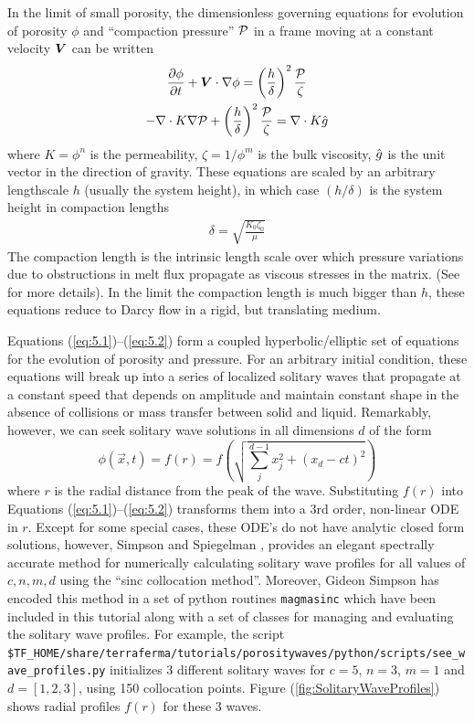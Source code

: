 In the limit of small porosity, the dimensionless governing equations for evolution
of porosity $\phi$ and ``compaction pressure'' $\mathcal{P}$ in a frame
moving at a constant velocity ${\mbox{\boldmath$V$}}$ can be written
\begin{gather}
  \frac{\partial\phi}{\partial t} + {\mbox{\boldmath$V$}}\cdot\nabla\phi = 
  \left(
    \frac{h}{\delta}
  \right)^{2}\frac{\mathcal{P}}{\zeta}  \label{eq:5.1}\\
-\nabla\cdot K \nabla\mathcal{P} + \left(
    \frac{h}{\delta}
  \right)^{2}\frac{\mathcal{P}}{\zeta} = \nabla\cdot K \hat{g}    \label{eq:5.2}
\end{gather}
where $K=\phi^{n}$ is the permeability, $\zeta = 1/\phi^{m}$ is the
bulk viscosity, $\hat{g}$ is the unit vector in the direction of
gravity.  These equations are scaled by an arbitrary lengthscale $h$
(usually the system height), in which case  $(h/\delta)$ is  the
system height  in compaction lengths
\begin{gather}
  \delta = \sqrt{\frac{K_{0}\zeta_0}{\mu}}
\end{gather}
The compaction length is the intrinsic length scale over which
pressure variations due to obstructions in melt flux propagate as
viscous stresses in the matrix. (See
\cite{spiegelman_flow_1993,spiegelman_flow_1993-1} for more
details). In the limit the compaction length is much bigger than $h$,
these equations reduce to Darcy flow in a rigid, but translating medium.

Equations (\ref{eq:5.1})--(\ref{eq:5.2}) form a coupled
hyperbolic/elliptic set of equations for the evolution of porosity and
pressure.  For an arbitrary initial condition, these equations will
break up into a series of localized solitary waves that propagate at a
constant speed that depends on amplitude and maintain constant shape
in the absence of collisions or mass transfer between solid and
liquid.  Remarkably, however, we can seek solitary wave solutions in
all dimensions $d$ of the form
\begin{equation}
  \label{eq:5.4}
  \phi(\vec{x},t) = f(r) = f
  \left(
    \sqrt{\sum_{j}^{d-1} x_{j}^{2} + (x_{d} -ct)^{2}}
  \right)
\end{equation}
where $r$ is the radial distance from the peak of the wave.
Substituting $f(r)$ into Equations (\ref{eq:5.1})--(\ref{eq:5.2})
transforms them into a 3rd order, non-linear ODE in $r$.  Except for
some special cases,  these ODE's do not have analytic closed form
solutions, however,  Simpson and Spiegelman
\cite{simpson_solitary_2011}, provides an elegant spectrally accurate
method for numerically calculating solitary wave profiles for all
values of $c,n,m,d$ using the ``sinc collocation method''.  Moreover,
Gideon Simpson has encoded this method in a set of python routines
\texttt{magmasinc} which have been included in this tutorial along
with a set of classes for managing and evaluating the solitary wave
profiles.  For example, the script
\texttt{\$TF\_HOME/share/terraferma/tutorials/porositywaves/python/scripts/see\_wave\_profiles.py} initializes 3 different
solitary waves for $c=5$, $n=3$, $m=1$ and $d=[1,2,3]$, using 150
collocation points.  Figure (\ref{fig:SolitaryWaveProfiles}) shows radial profiles $f(r)$ for these
3 waves.  

